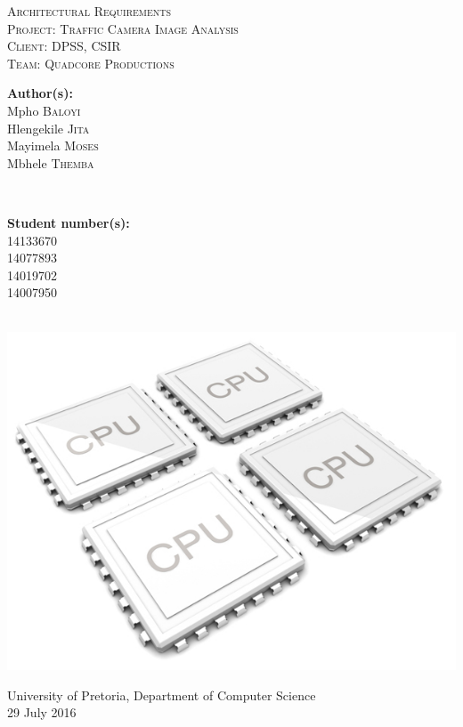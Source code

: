 \documentclass[a4paper,12pt]{article}
\begin{document}
\begin{titlepage}
\center

\textsc{\LARGE Architectural Requirements}\\[1.5cm]
\textsc{\Large Project: Traffic Camera Image Analysis}\\[1.5cm]
\textsc{\large Client: DPSS, CSIR}\\[0.5cm]
\textsc{\large Team: Quadcore Productions}\\[0.5cm]

\begin{minipage}{0.4\textwidth}
\begin{flushleft} \large
\textbf{Author(s):}\\
Mpho \textsc{Baloyi}\\
Hlengekile \textsc{Jita}\\
Mayimela \textsc{Moses}\\
Mbhele \textsc{Themba}\\
\end{flushleft}
\end{minipage}
~
\begin{minipage}{0.4\textwidth}
\begin{flushright} \large
\textbf{Student number(s):} \\
14133670\\ %
14077893\\
14019702\\
14007950\\
\end{flushright}
\end{minipage}\\

\includegraphics[width=\textwidth]{2012-quad-core-phones.jpg}

{\large University of Pretoria, Department of Computer Science}\\

{\large 29 July 2016}\\[3cm]

\vfil

\end{titlepage}
\end{document}
